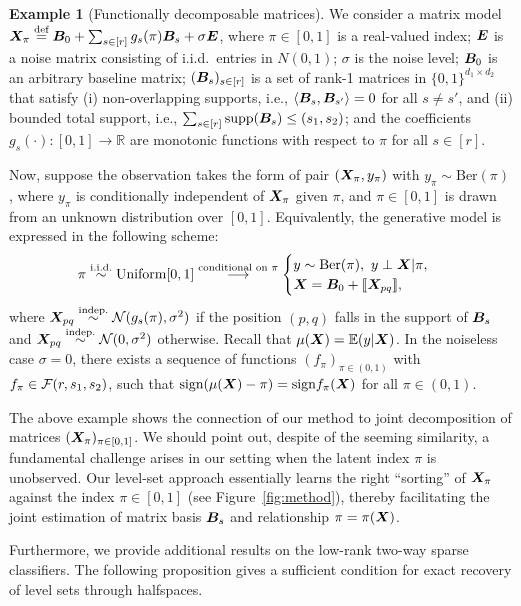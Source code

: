 \documentclass[11pt]{article}
\theoremstyle{plain}
\theoremstyle{definition}
\newtheorem{example}{Example}
\def\sign{\textup{sign}}
\begin{document}
\begin{example}[Functionally decomposable matrices]\label{ex:matrix_decomposition}
We consider a matrix model $\bm X_\pi\stackrel{\text{def}}{=}\bm B_0+ \sum_{s\in[r]}g_s(\pi)\bm B_s+\sigma \bm{E}$, where $\pi \in[0,1]$ is a real-valued index; $\bm{E}$ is a noise matrix consisting of i.i.d.\ entries in $N(0,1)$; $\sigma$ is the noise level; $\bm B_0$ is an arbitrary baseline matrix; $(\bm B_s)_{s\in[r]}$ is a set of rank-1 matrices in $\{0,1\}^{d_1\times d_2}$ that satisfy (i) non-overlapping supports, i.e., $\langle \bm B_s, \bm B_{s'}\rangle=0$ for all $s\neq s'$, and (ii) bounded total support, i.e., $\sum_{s\in[r]}\text{supp}(\bm B_s)\leq (s_1,s_2)$; and the coefficients $g_s(\cdot)\colon [0,1]\to\mathbb{R}$ are monotonic functions with respect to $\pi$ for all $s\in[r]$. 

Now, suppose the observation takes the form of pair $(\bm X_\pi,y_\pi)$ with $y_\pi \sim \text{Ber}(\pi)$, where $y_\pi$ is conditionally independent of $\bm X_\pi$ given $\pi$, and $\pi\in[0,1]$ is drawn from an unknown distribution over $[0,1]$. Equivalently, the generative model is expressed in the following scheme:
\[
\pi \stackrel{\text{i.i.d.}}{\sim} \text{Uniform}[0,1] \stackrel{\text{conditional on $\pi$}}{\longrightarrow}
\begin{cases}
y\sim \text{Ber}(\pi),\ y\perp \bm X|\pi, \\
\bm X=\bm B_0+\llbracket \bm X_{pq} \rrbracket,
\end{cases}
\]
where $ \bm X_{pq}\stackrel{\text{indep.}}{\sim}\mathcal{N}(g_{s}(\pi), \sigma^2)$ if  the position $(p,q)$ falls in the support of $\bm B_s$ and $ \bm X_{pq}\stackrel{\text{indep.}}{\sim}\mathcal{N}(0,\sigma^2)$  otherwise.  Recall that $\mu(\bm X)=\mathbb{E}(y|\bm X)$. In the noiseless case $\sigma = 0$, there exists a sequence of functions $(f_\pi)_{\pi\in(0,1)}$ with $f_\pi \in\mathcal{F}(r,s_1,s_2)$, such that $\sign (\mu(\mX)-\pi) = \sign f_\pi(\mX)$ for all $\pi \in (0,1)$.

The above example shows the connection of our method to joint decomposition of matrices $(\bm X_\pi)_{\pi\in[0,1]}$. We should point out, despite of the seeming similarity, a fundamental challenge arises in our setting when the latent index $\pi$ is unobserved. Our level-set approach essentially learns the right ``sorting'' of $\bm X_\pi$ against the index $\pi\in[0,1]$ (see Figure~\ref{fig:method}), thereby facilitating the joint estimation of matrix basis $\bm B_s$ and relationship $\pi=\pi(\bm X)$. 
\end{example}


Furthermore, we provide additional results on the low-rank two-way sparse classifiers. The following proposition gives a sufficient condition for exact recovery of level sets through halfspaces.
\end{document}
